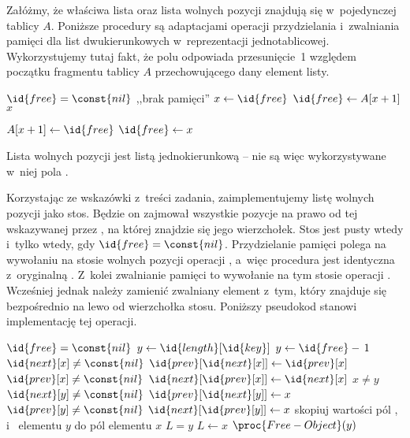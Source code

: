 \exercise %
Załóżmy, że właściwa lista oraz lista wolnych pozycji znajdują się w~pojedynczej tablicy $A$. Poniższe procedury są adaptacjami operacji przydzielania i~zwalniania pamięci dla list dwukierunkowych w~reprezentacji jednotablicowej. Wykorzystujemy tutaj fakt, że polu  odpowiada przesunięcie~1 względem początku fragmentu tablicy $A$ przechowującego dany element listy.
\begin{codebox}
\li	\If $\id{free}=\const{nil}$
\li		\Then \Error ,,brak pamięci''
		\End
\li	$x\gets\id{free}$
\li	$\id{free}\gets A[x+1]$
\li	\Return $x$
\end{codebox}

\begin{codebox}
\li	$A[x+1]\gets\id{free}$
\li	$\id{free}\gets x$
\end{codebox}

\exercise %
Lista wolnych pozycji jest listą jednokierunkową -- nie są więc wykorzystywane w~niej pola .

\exercise %
Korzystając ze wskazówki z~treści zadania, zaimplementujemy listę wolnych pozycji jako stos. Będzie on zajmował wszystkie pozycje na prawo od tej wskazywanej przez , na której znajdzie się jego wierzchołek. Stos jest pusty wtedy i~tylko wtedy, gdy $\id{free}=\const{nil}$. Przydzielanie pamięci polega na wywołaniu na stosie wolnych pozycji operacji , a~więc procedura  jest identyczna z~oryginalną . Z~kolei zwalnianie pamięci to wywołanie na tym stosie operacji . Wcześniej jednak należy zamienić zwalniany element z~tym, który znajduje się bezpośrednio na lewo od wierzchołka stosu. Poniższy pseudokod stanowi implementację tej operacji.
\begin{codebox}
\li	\If $\id{free}=\const{nil}$
\li		\Then $y\gets\id{length}[\id{key}]$
\li		\Else $y\gets\id{free}-\,1$
		\End
\li	\If $\id{next}[x]\ne\const{nil}$
\li		\Then $\id{prev}[\id{next}[x]]\gets\id{prev}[x]$
		\End
\li	\If $\id{prev}[x]\ne\const{nil}$
\li		\Then $\id{next}[\id{prev}[x]]\gets\id{next}[x]$
		\End
\li	\If $x\ne y$
\li		\Then
			\If $\id{next}[y]\ne\const{nil}$
\li				\Then $\id{prev}[\id{next}[y]]\gets x$
				\End
\li			\If $\id{prev}[y]\ne\const{nil}$
\li				\Then $\id{next}[\id{prev}[y]]\gets x$
				\End
		\End
\li	skopiuj wartości pól ,  i~ elementu $y$ do pól elementu $x$
\li	\If $L=y$
\li		\Then $L\gets x$
		\End
\li	$\proc{Free-Object}(y)$
\end{codebox}

